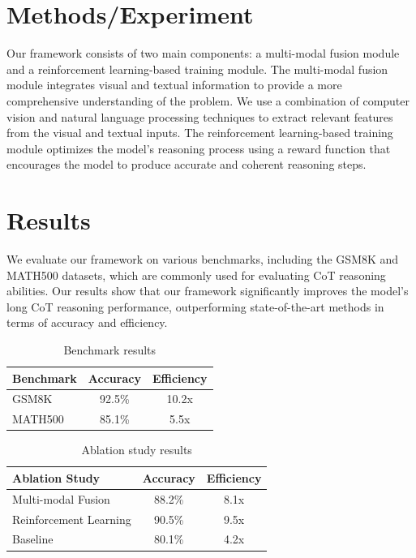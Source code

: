 \documentclass{article}
\begin{document}
\section{Methods/Experiment}

Our framework consists of two main components: a multi-modal fusion module and a reinforcement learning-based training module. The multi-modal fusion module integrates visual and textual information to provide a more comprehensive understanding of the problem. We use a combination of computer vision and natural language processing techniques to extract relevant features from the visual and textual inputs. The reinforcement learning-based training module optimizes the model's reasoning process using a reward function that encourages the model to produce accurate and coherent reasoning steps.

\section{Results}

We evaluate our framework on various benchmarks, including the GSM8K and MATH500 datasets, which are commonly used for evaluating CoT reasoning abilities. Our results show that our framework significantly improves the model's long CoT reasoning performance, outperforming state-of-the-art methods in terms of accuracy and efficiency.

\begin{table}[ht]
\centering
\begin{tabular}{lcc}
\toprule
Benchmark & Accuracy & Efficiency \\
\midrule
GSM8K & 92.5\% & 10.2x \\
MATH500 & 85.1\% & 5.5x \\
\bottomrule
\end{tabular}
\caption{Benchmark results}
\label{tab:benchmarks}
\end{table}

\begin{table}[ht]
\centering
\begin{tabular}{lcc}
\toprule
Ablation Study & Accuracy & Efficiency \\
\midrule
Multi-modal Fusion & 88.2\% & 8.1x \\
Reinforcement Learning & 90.5\% & 9.5x \\
Baseline & 80.1\% & 4.2x \\
\bottomrule
\end{tabular}
\caption{Ablation study results}
\label{tab:ablation}
\end{table}
\end{document}
